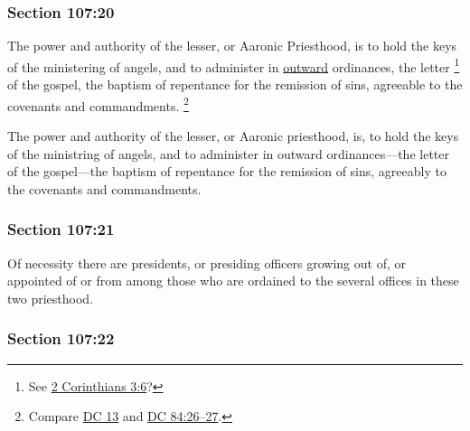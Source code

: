 	\subsubsection{Section 107:20} %
		\label{DC107-20}

		The power and authority of the lesser, or Aaronic Priesthood, is to hold the keys of the ministering of angels, and to administer in \hyperref[OUTWARD]{outward} ordinances, the letter%
			\footnote{%
				See \hyperref[2CORINTHIANS-3-6]{2 Corinthians 3:6}?
				} 
		of the gospel, the baptism of repentance for the remission of sins, agreeable to the covenants and commandments.%
			\footnote{%
				Compare \hyperref[DC13-1]{DC 13} and \hyperref[DC84-26]{DC 84:26--27}.
				}

		\begin{framed}
		\scriptsize
			\begin{compactdesc}
				\item[JSP] The power and authority of the lesser, or Aaronic priesthood, is, to hold the keys of the ministring of angels, and to administer in outward ordinances---the letter of the gospel---the baptism of repentance for the remission of sins, agreeably to the covenants and commandments.
			\end{compactdesc}
		\end{framed}

	\subsubsection{Section 107:21} %
		\label{DC107-21}

		Of necessity there are presidents, or presiding officers growing out of, or appointed of or from among those who are ordained to the several offices in these two priesthood.


	\subsubsection{Section 107:22} %
		\label{DC107-22}

